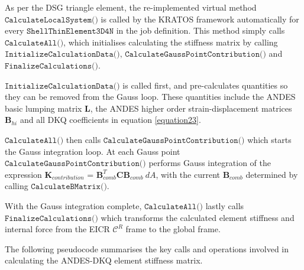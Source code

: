 As per the DSG triangle element, the re-implemented virtual method $\texttt{CalculateLocalSystem()}$ is called by the KRATOS framework automatically for every $\texttt{ShellThinElement3D4N}$ in the job definition. This method simply calls $\texttt{CalculateAll()}$, which initialises calculating the stiffness matrix by calling $\texttt{InitializeCalculationData(),\ CalculateGaussPointContribution()}$ and $\texttt{FinalizeCalculations()}$.

$\texttt{InitializeCalculationData()}$ is called first, and pre-calculates quantities so they can be removed from the Gauss loop. These quantities include the ANDES basic lumping matrix $\textbf{L}$, the ANDES higher order strain-displacement matrices $\textbf{B}_{hi}$ and all DKQ coefficients in equation  \eqref{equation23}.

$\texttt{CalculateAll()}$ then calls $\texttt{CalculateGaussPointContribution()}$ which starts the Gauss integration loop. At each Gauss point $\texttt{CalculateGaussPointContribution()}$ performs Gauss integration of the expression $\textbf{K}_{contribution}$ = $\textbf{B}_{comb}^T \textbf{C} \textbf{B}_{comb}\  dA$, with the current $\textbf{B}_{comb}$ determined by calling $\texttt{CalculateBMatrix()}$.

With the Gauss integration complete, $\texttt{CalculateAll()}$ lastly calls $\texttt{FinalizeCalculations()}$ which transforms the calculated element stiffness and internal force from the EICR $\mathscr{C}^R$ frame to the global frame.

The following pseudocode summarises the key calls and operations involved in calculating the ANDES-DKQ element stiffness matrix.

